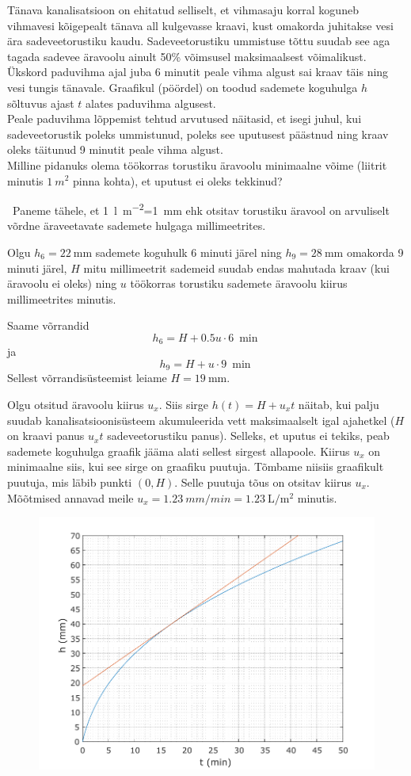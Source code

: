 
Tänava kanalisatsioon on ehitatud selliselt, et vihmasaju korral koguneb vihmavesi kõigepealt tänava all kulgevasse kraavi, kust omakorda juhitakse vesi ära sadeveetorustiku kaudu. Sadeveetorustiku ummistuse tõttu suudab see aga tagada sadevee äravoolu ainult 50\% võimsusel maksimaalsest võimalikust. Ükskord paduvihma ajal juba 6 minutit peale vihma algust sai kraav täis ning vesi tungis tänavale. Graafikul (pöördel) on toodud sademete koguhulga $h$ sõltuvus ajast $t$ alates paduvihma algusest. \\
Peale paduvihma lõppemist tehtud arvutused näitasid, et isegi juhul, kui sadeveetorustik poleks ummistunud, poleks see uputusest päästnud ning kraav oleks täitunud 9 minutit peale vihma algust.\\
Milline pidanuks olema töökorras torustiku äravoolu minimaalne võime (liitrit minutis $\SI{1} {m^2}$ pinna kohta), et uputust ei oleks tekkinud? 

\hint

\solu
\
Paneme tähele, et \SI{1}{l\per m^2}=\SI{1}{mm} ehk otsitav torustiku äravool on arvuliselt võrdne äraveetavate sademete hulgaga millimeetrites.

Olgu $h_6=\SI{22}{\mm}$ sademete koguhulk 6 minuti järel ning $h_9=\SI{28}{\mm}$ omakorda 9 minuti järel, $H$ mitu millimeetrit sademeid suudab endas mahutada kraav (kui äravoolu ei oleks) ning $u$ töökorras torustiku sademete äravoolu kiirus millimeetrites minutis.

Saame võrrandid
\[
h_6 = H +0.5 u \cdot \SI{6}{\min}
\]
ja
\[
h_9 = H + u \cdot \SI{9}{\min}
\]
Sellest võrrandisüsteemist leiame $H=\SI{19}{\mm}$.

Olgu otsitud äravoolu kiirus $u_x$. Siis sirge $h(t)=H+u_xt$ näitab, kui palju suudab kanalisatsioonisüsteem akumuleerida vett maksimaalselt igal ajahetkel ($H$ on kraavi panus $u_xt$ sadeveetorustiku panus). Selleks, et uputus ei tekiks, peab sademete koguhulga graafik jääma alati sellest sirgest allapoole. Kiirus $u_x$ on minimaalne siis, kui see sirge on graafiku puutuja. Tõmbame niisiis graafikult puutuja, mis läbib punkti $(0,H)$. Selle puutuja tõus on otsitav kiirus $u_x$. Mõõtmised annavad meile $u_x=\SI{1.23}{mm/min}=\SI{1.23}{\L\per\m\squared}$ minutis.

\begin{figure}[h]
	\vspace{-1em}
    \centering
    \includegraphics[width=0.75\linewidth]{2022-v3g-07-yl.pdf}
\end{figure}
\probend